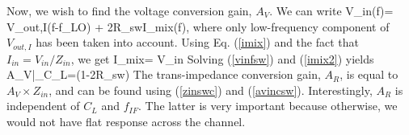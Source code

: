Now, we wish to find the voltage conversion gain, $A_V$. 
We can write
\beq
V_{in}(f)= V_{out,I}(f-f_{LO}) + 2R_{sw}I_{mix}(f),
\label{vinfsw}
\eeq
where only low-frequency component of $V_{out,I}$ has been taken into account. Using Eq. (\ref{imix}) and the fact that $I_{in}=V_{in}/Z_{in}$, we get
\beq
I_{mix}= V_{in}
\label{imix2}
\eeq
Solving (\ref{vinfsw}) and (\ref{imix2}) yields
\beq
A_V|_{C_L}=\left(1-2R_{sw}\right)
\label{avincsw}
\eeq
The trans-impedance conversion gain, $A_R$, is equal to $A_V \times Z_{in}$, and can be found using (\ref{zinswc}) and (\ref{avincsw}).
Interestingly, $A_R$ is independent of $C_L$ and $f_{IF}$. The latter is very important because otherwise, we would not have flat response across the
channel.


